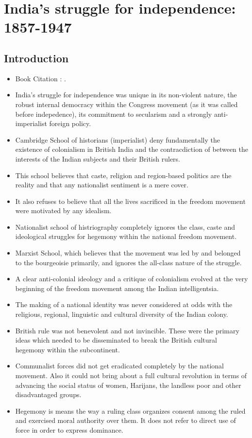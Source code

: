 \chapter{India's struggle for independence: 1857-1947}

\section*{Introduction}
\begin{itemize}
    \item Book Citation : \cite{Bipan__2016}.
    \item India's struggle for independence was unique in its non-violent nature, the robust internal democracy within the Congress movement (as it was called before indepedence), its commitment to secularism and a strongly anti-imperialist foreign policy.
    \item Cambridge School of historians (imperialist) deny fundamentally the existence of colonialism in British India and the contracdiction of between the interests of the Indian subjects and their British rulers.
    \item This school believes that caste, religion and region-based politics are the reality and that any nationalist sentiment is a mere cover.
    \item It also refuses to believe that all the lives sacrificed in the freedom movement were motivated by any idealism.
    \item Nationalist school of \gls{histriography} completely ignores the class, caste and ideological struggles for hegemony within the national freedom movement.
    \item Marxist School, which believes that the movement was led by and belonged to the bourgeoisie primarily, and ignores the all-class nature of the struggle.
    \item A clear anti-colonial ideology and a critique of colonialism evolved at the very beginning of the freedom movement among the Indian intelligentsia.
    \item The making of a national identity was never considered at odds with the religious, regional, linguistic and cultural diversity of the Indian colony.
    \item British rule was not benevolent and not invincible. These were the primary ideas which needed to be disseminated to break the British cultural hegemony within the subcontinent.
    \item Communalist forces did not get eradicated completely by the national movement. Also it could not bring about a full cultural revolution in terms of advancing the social status of women, Harijans, the landless poor and other disadvantaged groups.
    \item Hegemony is means the way a ruling class organizes consent among the ruled and exercised moral authority over them. It does not refer to direct use of force in order to express dominance.
\end{itemize}

